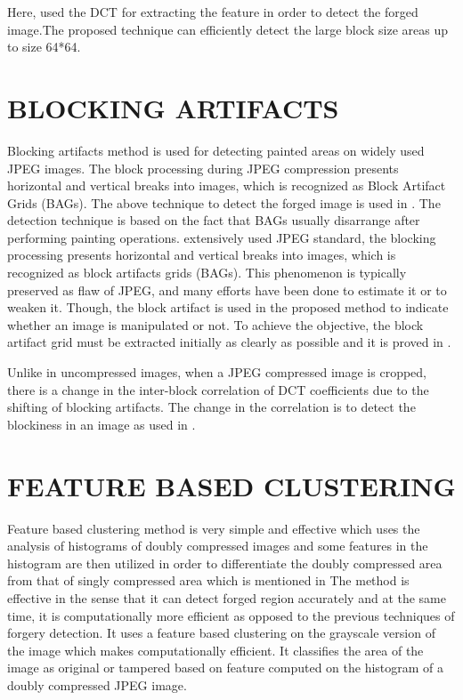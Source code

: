 \bigskip
Here, \cite{somnath} used the DCT for extracting the feature in order to detect the forged image.The proposed technique can efficiently detect the large block size areas up to size 64*64. 
\bigskip

\bigskip
\section{BLOCKING ARTIFACTS}
Blocking artifacts method is used for detecting painted areas on widely used JPEG images. The block processing during JPEG compression presents horizontal and vertical breaks into images, which is recognized as Block Artifact Grids (BAGs). The above technique to detect the forged image is used in \cite{ali}. The detection technique is based on the fact that BAGs usually disarrange after performing painting operations. extensively used JPEG standard, the blocking processing presents horizontal and vertical breaks into images, which is recognized as block artifacts grids (BAGs). This phenomenon is typically preserved as flaw of JPEG, and many efforts have been done to estimate it or to weaken it. Though, the block artifact is used in the proposed method to indicate whether an image is manipulated or not. To achieve the objective, the block artifact grid must be extracted initially as clearly as possible and it is proved in \cite{yu}.

\bigskip
Unlike in uncompressed images, when a JPEG compressed image is cropped, there is a change in the inter-block correlation of DCT coefficients due to the shifting of blocking artifacts. The change in the correlation is to detect the blockiness in an image as used in \cite{vinod}.
\section{FEATURE BASED CLUSTERING}
Feature based clustering method is very simple and effective which uses the analysis of histograms of doubly compressed images and some features in the histogram are then utilized in order to differentiate the doubly compressed area from that of singly compressed area which is mentioned in \cite{bhartia} The method is effective in the sense that it can detect forged region accurately and at the same time, it is computationally more efficient as opposed to the previous techniques of forgery detection. It uses a feature based clustering on the grayscale version of the image which makes computationally efficient. It classifies the area of the image as original or tampered based on feature computed on the histogram of a doubly compressed JPEG image.

